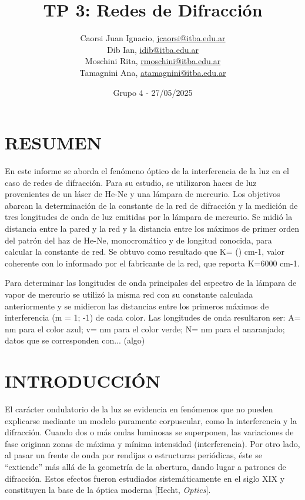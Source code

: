 \documentclass[12pt, a4paper]{article}
\title{TP 3: Redes de Difracción}
\author
{
  Caorsi Juan Ignacio, \href{jcaorsi@itba.edu.ar}{jcaorsi@itba.edu.ar} \\
  Dib Ian, \href{idib@itba.edu.ar}{idib@itba.edu.ar} \\
  Moschini Rita, \href{rmoschini@itba.edu.ar}{rmoschini@itba.edu.ar} \\
  Tamagnini Ana, \href{atamagnini@itba.edu.ar}{atamagnini@itba.edu.ar}
}
\date{Grupo 4 - 27/05/2025}
\begin{document}
\maketitle



\section{RESUMEN}
En este informe se aborda el fenómeno óptico de la interferencia de la luz en el caso de redes de difracción. Para su estudio, se utilizaron
haces de luz provenientes de un láser de He-Ne y una lámpara de mercurio. Los objetivos abarcan la determinación de la constante de la red 
de difracción y la medición de tres longitudes de onda de luz emitidas por la lámpara de mercurio. Se midió la distancia entre la pared y 
la red y la distancia entre los máximos de primer orden del patrón del haz de He-Ne, monocromático y de longitud conocida, para calcular la 
constante de red. Se obtuvo como resultado que K= () cm-1, valor coherente con lo informado por el fabricante de la red, que reporta K=6000 
cm-1.

Para determinar las longitudes de onda principales del espectro de la lámpara de vapor de mercurio se utilizó la misma red con su constante 
calculada anteriormente y se midieron las distancias entre los primeros máximos de interferencia (m = 1; -1) de cada color. Las longitudes 
de onda resultaron ser:
A= nm para el color azul;
v= nm para el color verde;
N= nm para el anaranjado;
datos que se corresponden con... (algo)


\section{INTRODUCCIÓN}

El carácter ondulatorio de la luz se evidencia en fenómenos que no pueden explicarse mediante un modelo puramente corpuscular, como la 
interferencia y la difracción. Cuando dos o más ondas luminosas se superponen, las variaciones de fase originan zonas de máxima y mínima 
intensidad (interferencia). Por otro lado, al pasar un frente de onda por rendijas o estructuras periódicas, éste se “extiende” más allá 
de la geometría de la abertura, dando lugar a patrones de difracción. Estos efectos fueron estudiados sistemáticamente en el siglo XIX y 
constituyen la base de la óptica moderna [Hecht, \emph{Optics}].
\end{document}
